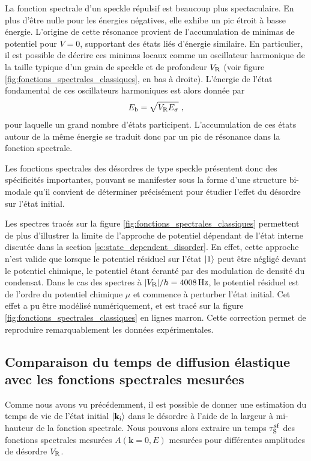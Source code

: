 La fonction spectrale d'un speckle répulsif est beaucoup plus spectaculaire. En plus d'être nulle pour les énergies négatives, elle exhibe un pic étroit à basse énergie. L'origine de cette résonance provient de l'accumulation de minimas de potentiel pour $V=0$, supportant des états liés d'énergie similaire\citep{prat2016semiclassical}. En particulier, il est possible de décrire ces minimas locaux comme un oscillateur harmonique de la taille typique d'un grain de speckle et de profondeur $V_{\mathrm{R}}$ (voir figure \ref{fig:fonctions_spectrales_classiques}, en bas à droite). L'énergie de l'état fondamental de ces oscillateurs harmoniques est alors donnée par 
\begin{equation}
E_{\mathrm{b}}=\sqrt{V_{\mathrm{R}}E_{\sigma}} \text{ ,}
\end{equation}
pour laquelle un grand nombre d'états participent. L'accumulation de ces états autour de la même énergie se traduit donc par un pic de résonance dans la fonction spectrale. 

Les fonctions spectrales des désordres de type speckle présentent donc des spécificités importantes, pouvant se manifester sous la forme d'une structure bi-modale qu'il convient de déterminer précisément pour étudier l'effet du désordre sur l'état initial. 

Les spectres tracés sur la figure \ref{fig:fonctions_spectrales_classiques} permettent de plus d'illustrer la limite de l'approche de potentiel dépendant de l'état interne discutée dans la section \ref{sc:state_dependent_disorder}. En effet, cette approche n'est valide que lorsque le potentiel résiduel sur l'état $\left| 1 \right\rangle$ peut être négligé devant le potentiel chimique, le potentiel étant écranté par des modulation de densité du condensat. Dans le cas des spectres à $|V_{\mathrm{R}}|/h=\SI{4008}{\hertz}$, le potentiel résiduel est de l'ordre du potentiel chimique $\mu$ et commence à perturber l'état initial. Cet effet a pu être modélisé numériquement, et est tracé sur la figure \ref{fig:fonctions_spectrales_classiques} en lignes marron. Cette correction permet de reproduire remarquablement les données expérimentales.


\subsection{Comparaison du temps de diffusion élastique avec les fonctions spectrales mesurées}
Comme nous avons vu précédemment, il est possible de donner une estimation du temps de vie de l'état initial $\left| \mathbf{k}_{\mathrm{i}} \right\rangle$ dans le désordre à l'aide de la largeur à mi-hauteur de la fonction spectrale. Nous pouvons alors extraire un temps $\tau_{\mathrm{S}}^{\mathrm{sf}}$ des fonctions spectrales mesurées $A(\mathbf{k}=0,E)$ mesurées pour différentes amplitudes de désordre $V_{\mathrm{R}}$.


